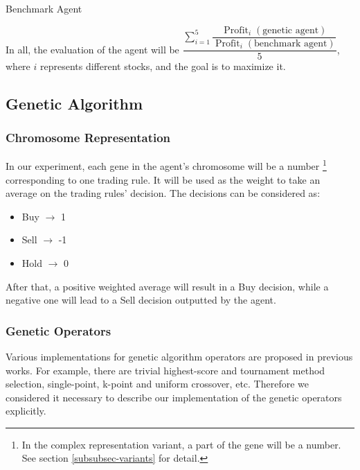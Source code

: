\documentclass{article}
\begin{document}
\begin{algorithm}[H]

    \caption{Benchmark Agent}
\end{algorithm}

In all, the evaluation of the agent will be
$
\dfrac{\sum \limits_{i=1}^{5}
\dfrac{
    \operatorname{Profit}_i(\text{genetic agent})
}{
    \operatorname{Profit}_i(\text{benchmark agent})
}}{5}$, where $i$ represents different stocks, and the goal is to maximize it.


\subsection{Genetic Algorithm}

\subsubsection{Chromosome Representation}

In our experiment, each gene in the agent's chromosome will be a number
\footnote{In the complex representation variant,
a part of the gene will be a number.
See section \ref{subsubsec-variants} for detail.}
corresponding to one trading rule.
It will be used as the weight to take an average on the trading rules' decision.
The decisions can be considered as:
\begin{itemize}
    \item Buy $\rightarrow$ 1
    \item Sell $\rightarrow$ -1
    \item Hold $\rightarrow$ 0
\end{itemize}

After that, a positive weighted average will result in a Buy decision,
while a negative one will lead to a Sell decision outputted by the agent.

\subsubsection{Genetic Operators}

Various implementations for genetic algorithm operators are proposed in previous works.
For example, there are trivial highest-score and tournament method\cite{a-note-on-boltzmann-tournament-selection} selection,
single-point, k-point and uniform crossover\cite{genetic-algorithm-review-and-application}, etc.
Therefore we considered it necessary to describe
our implementation of the genetic operators explicitly.
\end{document}
